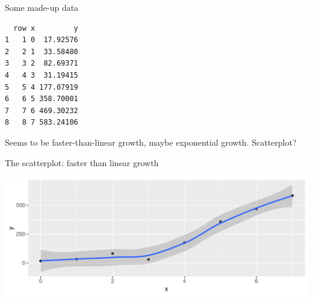 \begin{frame}[fragile]{Some made-up data}
  
 
\begin{knitrout}
\color{fgcolor}\begin{kframe}
\begin{alltt}
\hlkwb{=}\hlstd{(}\hlstd{)}
\end{alltt}
\begin{verbatim}
  row x         y
1   1 0  17.92576
2   2 1  33.58480
3   3 2  82.69371
4   4 3  31.19415
5   5 4 177.07919
6   6 5 358.70001
7   7 6 469.30232
8   8 7 583.24106
\end{verbatim}
\end{kframe}
\end{knitrout}
  
Seems to be faster-than-linear growth, maybe exponential growth. Scatterplot?

 

  
\end{frame}

\begin{frame}[fragile]{The scatterplot: faster than linear growth}

  
 
\begin{knitrout}
\color{fgcolor}\begin{kframe}
\begin{alltt}
\hlstd{(}\hlopt{+}\hlstd{()}\hlopt{+}
  \hlstd{()}
\end{alltt}


{\ttfamily\noindent\itshape\color{messagecolor}{`geom\_smooth()` using method = 'loess'}}\end{kframe}
\includegraphics[width=\maxwidth]{figure/dsljhsdjlhf-1} 

\end{knitrout}

  
  
\end{frame}

